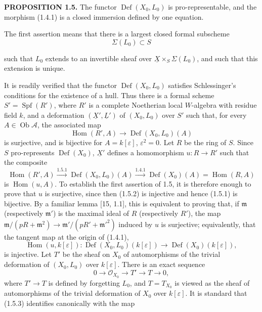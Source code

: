 \documentclass[10pt]{article}
\newcommand{\UX}{\underline{X}}
\newcommand{\UL}{\underline{L}}
\begin{document}
\noindent\textbf{PROPOSITION 1.5.} The functor $\operatorname{Def}(X_0,L_0)$ is pro-representable, and the morphism (1.4.1) is a closed immersion defined by one equation.

The first assertion means that there is a largest closed formal subscheme
\begin{equation}\tag{1.5.0}
\Sigma(L_0)\subset S
\end{equation}
\newpage
\setcounter{footnote}{0}
\fontsize{10.2pt}{12.04pt}\selectfont

such that $L_0$ extends to an invertible sheaf over $\UX\times_S\Sigma(L_0)$, and such that this extension is unique.

It is readily verified that the functor $\operatorname{Def}(X_0,L_0)$ satisfies Schlessinger's conditions for the existence of a hull. Thus there is a formal scheme $S'=\operatorname{Spf}(R')$, where $R'$ is a complete Noetherian local $W$-algebra with residue field $k$, and a deformation $(\UX',\UL')$ of $(X_0,L_0)$ over $S'$ such that, for every $A\in\operatorname{Ob}\mathcal A$, the associated map
\begin{equation}\tag{1.5.1}
\operatorname{Hom}(R',A)\longrightarrow\operatorname{Def}(X_0,L_0)(A)
\end{equation}
is surjective, and is bijective for $A=k[\varepsilon]$, $\varepsilon^2=0$. Let $R$ be the ring of $S$. Since $S$ pro-represents $\operatorname{Def}(X_0)$, $\UX'$ defines a homomorphism $u:R\to R'$ such that the composite
\begin{equation}\tag{1.5.2}
\operatorname{Hom}(R',A)\xrightarrow{1.5.1}\operatorname{Def}(X_0,L_0)(A)
\xrightarrow{1.4.1}\operatorname{Def}(X_0)(A)=\operatorname{Hom}(R,A)
\end{equation}
is $\operatorname{Hom}(u,A)$. To establish the first assertion of 1.5, it is therefore enough to prove that $u$ is surjective, since then (1.5.2) is injective and hence (1.5.1) is bijective. By a familiar lemma [15, 1.1], this is equivalent to proving that, if $\mathfrak m$ (respectively $\mathfrak m'$) is the maximal ideal of $R$ (respectively $R'$), the map
$\mathfrak m/(pR+\mathfrak m^2)\to\mathfrak m'/(pR'+\mathfrak m'^2)$ induced by $u$ is surjective; equivalently, that the tangent map at the origin of (1.4.1),
\begin{equation}\tag{1.5.3}
\operatorname{Hom}(u,k[\varepsilon]):\operatorname{Def}(X_0,L_0)(k[\varepsilon])
\longrightarrow\operatorname{Def}(X_0)(k[\varepsilon]),
\end{equation}
is injective. Let $T'$ be the sheaf on $X_0$ of automorphisms of the trivial deformation of $(X_0,L_0)$ over $k[\varepsilon]$. There is an exact sequence
\begin{equation}\tag{1.5.4}
0\longrightarrow\mathcal O_{X_0}\longrightarrow T'\longrightarrow T\longrightarrow0,
\end{equation}
where $T'\to T$ is defined by forgetting $L_0$, and $T=T_{X_0}$ is viewed as the sheaf of automorphisms of the trivial deformation of $X_0$ over $k[\varepsilon]$. It is standard that (1.5.3) identifies canonically with the map
\newpage
\setcounter{footnote}{0}
\fontsize{10.2pt}{12.04pt}\selectfont
\end{document}
